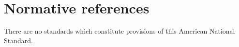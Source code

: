 \chapter{Normative references}\label{normative-references}

There are no standards which constitute provisions of this American
National Standard.
